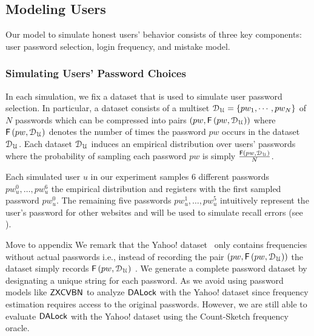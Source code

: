 
\vspace*{-\baselineskip}
\subsection{Modeling Users} \label{section:ExperimentDesign-subsection:SimulateUser}

Our model to simulate honest users' behavior consists of three key components: user password selection, login frequency, and mistake model. 

\vspace*{-\baselineskip}
\subsubsection{Simulating Users’ Password Choices}\label{section:ExperimentDesign-subsection:SimulateUser-subsubsection:SimulatePasswordChoice}
\vspace*{-\baselineskip}
In each simulation, we fix a dataset that is used to simulate user password selection. In particular, a dataset consists of a multiset $\mathcal{D}_{{\mathcal{U}}} = \{pw_1,\cdots,pw_N\}$ of $N$ passwords which can be compressed into pairs $(pw,  \mathsf{F}\left(pw, \mathcal{D}_{{\mathcal{U}}} \right))$ where $\mathsf{F}\left(pw, \mathcal{D}_{{\mathcal{U}}} \right)$ denotes the number of times the password $pw$ occurs in the dataset $\mathcal{D}_{{\mathcal{U}}}$. Each dataset $\mathcal{D}_{{\mathcal{U}}} $ induces an empirical distribution over users’ passwords where the probability of sampling each password $pw$ is simply $\frac{\mathsf{F}\left(pw, \mathcal{D}_{{\mathcal{U}}}\right)}{N}$. 

 Each simulated user $u$ in our experiment samples 6 different passwords $pw_{u}^0,\ldots, pw_u^6$  the empirical distribution and registers with the first sampled password $pw_u^{0}$. The remaining five passwords $pw_{u}^1,\ldots, pw_u^5$  intuitively represent the user's password for other websites and will be used to simulate recall errors (see ).  



Move to appendix We remark that the Yahoo! dataset~\cite{SP:Bonneau12,NDSS:BloDatBon16} only contains frequencies without actual passwords i.e., instead of recording the pair $(pw,  \mathsf{F}\left(pw, \mathcal{D}_{{\mathcal{U}}} \right))$ the dataset simply records $\mathsf{F}\left(pw, \mathcal{D}_{{\mathcal{U}}} \right)$ . We generate a complete password dataset by designating a unique string for each password. As we avoid using password models like $\mathsf{ZXCVBN}$ to analyze $\mathsf{DALock}$ with the Yahoo! dataset since frequency estimation requires access to the original passwords. However, we are still able to evaluate $\mathsf{DALock}$ with the Yahoo! dataset using the Count-Sketch frequency oracle. 

